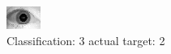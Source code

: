 \begin{figure}[h!]
\begin{center}
\includegraphics[width=0.60\columnwidth]{figures/ID1769_class_3_target_2.png}
\end{center}
\caption{ Classification: 3 actual target: 2}
\label{fig:ID1769_class_3_target_2}
\end{figure}
